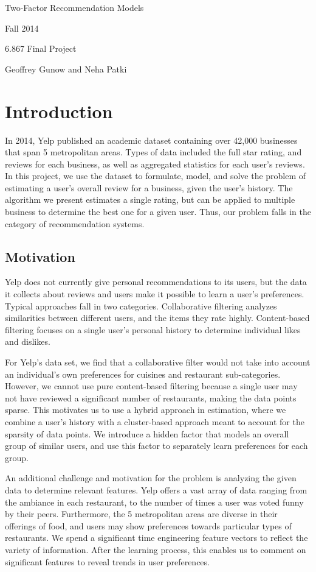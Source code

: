 \documentclass[11pt]{article}
\author{6.867 Homework 2 and 3}
\begin{document}
\noindent\centerline{\LARGE{Two-Factor Recommendation Models}}
\noindent\centerline{}
\noindent\centerline{}
\noindent\centerline{Fall 2014}
\noindent\centerline{6.867 Final Project}
\noindent\centerline{Geoffrey Gunow and Neha Patki}

\section{Introduction}
In 2014, Yelp published an academic dataset containing over 42,000 businesses that span 5 metropolitan areas. Types of data included the full star rating, and reviews for each business, as well as aggregated statistics for each user's reviews. In this project, we use the dataset to formulate, model, and solve the problem of estimating a user's overall review for a business, given the user's history. The algorithm we present estimates a single rating, but can be applied to multiple business to determine the best one for a given user. Thus, our problem falls in the category of recommendation systems.

\subsection{Motivation}
Yelp does not currently give personal recommendations to its users, but the data it collects about reviews and users make it possible to learn a user's preferences. Typical approaches fall in two categories. Collaborative filtering analyzes similarities between different users, and the items they rate highly. Content-based filtering focuses on a single user's personal history to determine individual likes and dislikes.

For Yelp's data set, we find that a collaborative filter would not take into account an individual's own preferences for cuisines and restaurant sub-categories. However, we cannot use pure content-based filtering because a single user may not have reviewed a significant number of restaurants, making the data points sparse. This motivates us to use a hybrid approach in estimation, where we combine a user's history with a cluster-based approach meant to account for the sparsity of data points. We introduce a hidden factor that models an overall group of similar users, and use this factor to separately learn preferences for each group.

An additional challenge and motivation for the problem is analyzing the given data to determine relevant features. Yelp offers a vast array of data ranging from the ambiance in each restaurant, to the number of times a user was voted funny by their peers. Furthermore, the 5 metropolitan areas are diverse in their offerings of food, and users may show preferences towards particular types of restaurants. We spend a significant time engineering feature vectors to reflect the variety of information. After the learning process, this enables us to comment on significant features to reveal trends in user preferences. 
\end{document}
